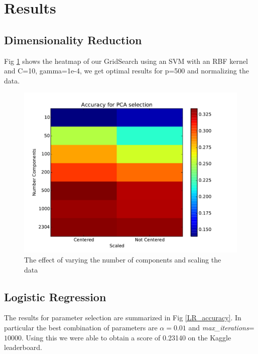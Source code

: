 \documentclass[conference]{IEEEtran}
\begin{document}
\section{Results}

\subsection{Dimensionality Reduction}

Fig \ref{gridsearchpca} shows the heatmap of our GridSearch using an SVM with an RBF kernel and C=10, gamma=1e-4, we get optimal results for p=500 and normalizing the data. 

\begin{figure}[h]
	\centering
	\includegraphics[scale=0.35]{PCA_gridsearch.pdf}
	\caption{The effect of varying the number of components and scaling the data}
	\label{gridsearchpca}
\end{figure}

\subsection{Logistic Regression}
The results for parameter selection are summarized in Fig \ref{LR_accuracy}. In particular the best combination of parameters are $\alpha=0.01$ and \emph{max\_iterations}=$10000$. Using this we were able to obtain a score of 0.23140 on the Kaggle leaderboard.
\end{document}
